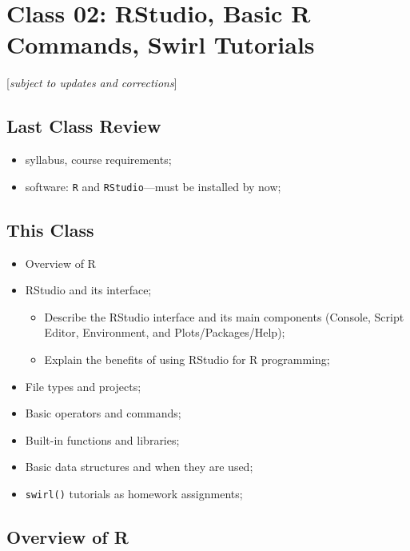 \documentclass[
]{book}
\providecommand{\tightlist}{%
  \setlength{\itemsep}{0pt}\setlength{\parskip}{0pt}}
\begin{document}
\hypertarget{class-02-rstudio-basic-r-commands-swirl-tutorials}{%
\chapter{Class 02: RStudio, Basic R Commands, Swirl Tutorials}\label{class-02-rstudio-basic-r-commands-swirl-tutorials}}

{[}\emph{subject to updates and corrections}{]}

\hypertarget{last-class-review}{%
\section{Last Class Review}\label{last-class-review}}

\begin{itemize}
\tightlist
\item
  syllabus, course requirements;
\item
  software: \texttt{R} and \texttt{RStudio}---must be installed by now;
\end{itemize}

\hypertarget{this-class}{%
\section{This Class}\label{this-class}}

\begin{itemize}
\tightlist
\item
  Overview of R
\item
  RStudio and its interface;

  \begin{itemize}
  \tightlist
  \item
    Describe the RStudio interface and its main components (Console, Script Editor, Environment, and Plots/Packages/Help);
  \item
    Explain the benefits of using RStudio for R programming;
  \end{itemize}
\item
  File types and projects;
\item
  Basic operators and commands;
\item
  Built-in functions and libraries;
\item
  Basic data structures and when they are used;
\item
  \texttt{swirl()} tutorials as homework assignments;
\end{itemize}

\hypertarget{overview-of-r}{%
\section{Overview of R}\label{overview-of-r}}
\end{document}
